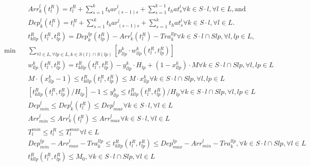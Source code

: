 \begin{align}
  & \mathit{Arr}_{k}^{l} \left(t_{l}^{R}\right) = t_{l}^{R} + \sum_{s = 1}^{k} t_bar_{\left(s - 1\right) s}^{l} + \sum_{s = 1}^{k - 1} t_hat_{s}^{l} \forall k \in S \cdot l , \forall l \in L , \text{and} \tag{eq\_0001} \\
  & \mathit{Dep}_{k}^{l} \left(t_{l}^{R}\right) = t_{l}^{R} + \sum_{s = 1}^{k} t_bar_{\left(s - 1\right) s}^{l} + \sum_{s = 1}^{k} t_hat_{s}^{l} \forall k \in S \cdot l , \forall l \in L . \tag{eq\_0002} \\
  & t_{k l lp}^{R} \left(t_{l}^{R} , t_{lp}^{R}\right) = \mathit{Dep}_{k}^{lp} \left(t_{lp}^{R}\right) - \mathit{Arr}_{k}^{l} \left(t_{l}^{R}\right) - \mathit{Tra}_{k}^{l lp} \forall k \in S \cdot l \cap S lp , \forall l , lp \in L , \tag{eq\_0003} \\
  \min\quad & \sum_{\forall l \in L, \forall lp \in L, k \in S \left(l\right) \cap S \left(lp\right)} \left[p_{l lp}^{k} \cdot w_{l lp}^{k} \left(t_{l}^{R} , t_{lp}^{R}\right)\right] \tag{eq\_0006} \\
  & w_{l lp}^{k} \left(t_{l}^{R} , t_{lp}^{R}\right) = t_{k l lp}^{R} \left(t_{l}^{R} , t_{lp}^{R}\right) - y_{l lp}^{k} \cdot H_{lp} + \left(1 - x_{l lp}^{k}\right) \cdot M \forall k \in S \cdot l \cap S lp , \forall l , lp \in L \tag{eq\_0007} \\
  & M \cdot \left(x_{l lp}^{k} - 1\right) \leq t_{k l lp}^{R} \left(t_{l}^{R} , t_{lp}^{R}\right) \leq M \cdot x_{l lp}^{k} \forall k \in S \cdot l \cap S lp , \forall l , lp \in L \tag{eq\_0008} \\
  & \left[t_{k l lp}^{R} \left(t_{l}^{R} , t_{lp}^{R}\right) / H_{lp}\right] - 1 \leq y_{l lp}^{k} \leq t_{k l lp}^{R} \left(t_{l}^{R} , t_{lp}^{R}\right) / H_{lp} \forall k \in S \cdot l \cap S lp , \forall l , lp \in L \tag{eq\_0009} \\
  & \mathit{Dep}_{min}^{l} \leq \mathit{Dep}_{k}^{l} \left(t_{l}^{R}\right) \leq \mathit{Dep}_{max}^{l} \forall k \in S \cdot l , \forall l \in L \tag{eq\_0012} \\
  & \mathit{Arr}_{min}^{l} \leq \mathit{Arr}_{k}^{l} \left(t_{l}^{R}\right) \leq \mathit{Arr}_{max}^{l} \forall k \in S \cdot l , \forall l \in L \tag{eq\_0013} \\
  & T_{l}^{min} \leq t_{l}^{R} \leq T_{l}^{max} \forall l \in L \tag{eq\_0014} \\
  & \mathit{Dep}_{min}^{lp} - \mathit{Arr}_{max}^{l} - \mathit{Tra}_{k}^{l lp} \leq t_{k l lp}^{R} \left(t_{l}^{R} , t_{lp}^{R}\right) \leq \mathit{Dep}_{max}^{lp} - \mathit{Arr}_{min}^{l} - \mathit{Tra}_{k}^{l lp} , \forall k \in S \cdot l \cap S lp , \forall l \in L \tag{eq\_0015} \\
  & t_{k l lp}^{R} \left(t_{l}^{R} , t_{lp}^{R}\right) \leq M_{0} , \forall k \in S \cdot l \cap S lp , \forall l \in L \tag{eq\_0016} \\
\end{align}
